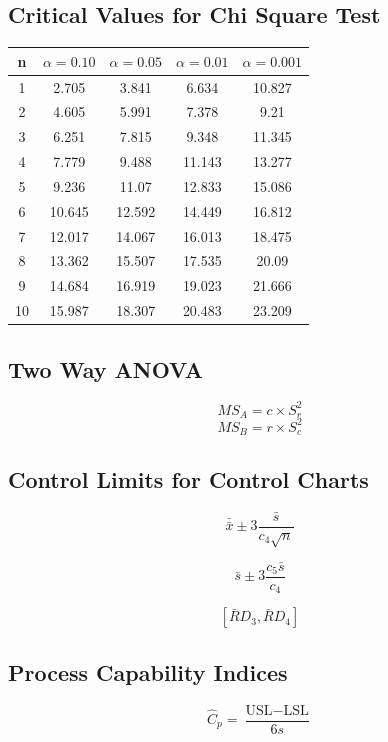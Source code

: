\documentclass[a4paper,12pt]{article}
\begin{document}
	\subsection*{Critical Values for Chi Square Test}
	{
		\Large
		\begin{center}
			\begin{tabular}{|c|c|c|c|c|}
				\hline 
				n	&	$\alpha=0.10$	&	$\alpha=0.05$	&	$\alpha=0.01$	&	$\alpha=0.001$	\\ \hline
				1	& 	2.705	&	3.841	&	6.634	&	10.827	\\ \hline
				2	&	4.605	&	5.991	&	7.378	&	9.21	\\ \hline
				3	&	6.251	&	7.815	&	9.348	&	11.345	\\ \hline
				4	&	7.779	&	9.488	&	11.143	&	13.277	\\ \hline
				5	&	9.236	&	11.07	&	12.833	&	15.086	\\ \hline
				6	&	10.645	&	12.592	&	14.449	&	16.812	\\ \hline
				7	&	12.017	&	14.067	&	16.013	&	18.475	\\ \hline
				8	&	13.362	&	15.507	&	17.535	&	20.09	\\ \hline
				9	&	14.684	&	16.919	&	19.023	&	21.666	\\ \hline
				10	&	15.987	&	18.307	&	20.483	&	23.209	\\ \hline
			\end{tabular} 
		\end{center}
	}
\newpage

\subsection*{Two Way ANOVA}
\[MS_A = c \times S^2_r\]
\[MS_B = r \times S^2_c\]

\subsection*{Control Limits for Control Charts}

\[ \bar{\bar{x}} \pm 3\frac{\bar{s}}{c_4\sqrt{n}}\]

\[ \bar{s} \pm 3\frac{c_5\bar{s}}{c_4}\]

\[\left[ \bar{R}D_3, \bar{R}D_4\right]\]

\subsection*{Process Capability Indices}
\[ \hat{C}_p = \frac{\mbox{USL} - \mbox{LSL}}{6s}\]
\end{document}
